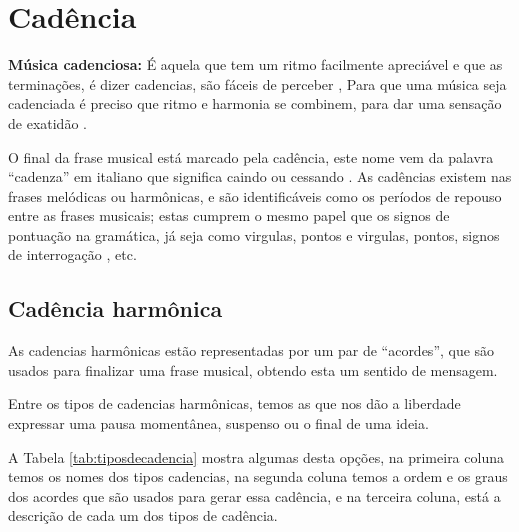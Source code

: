 \section{Cadência}
\label{sec:Cadencia}

\begin{tcbinformation} 
\textbf{Música cadenciosa:}
\label{ref:musicacadenciosa}
É aquela que tem um ritmo facilmente apreciável e que as terminações, é dizer cadencias,
são fáceis de perceber \cite[pp. 60]{pedrell2009diccionario},
Para que uma música seja cadenciada é preciso que ritmo e harmonia se combinem, 
para dar uma sensação de exatidão \cite[pp. 68]{melcior1859diccionario}.
\end{tcbinformation} 


O final da frase musical está marcado pela cadência, 
este nome vem da palavra ``cadenza''  em italiano que significa caindo ou cessando \cite[pp. 34]{bennett1993elementos} \cite[pp. 68]{melcior1859diccionario}. 
As cadências existem nas frases melódicas ou harmônicas, 
e são identificáveis como os períodos de repouso entre as frases musicais;
estas cumprem o mesmo papel que os signos de pontuação na gramática, 
já seja como virgulas, pontos e virgulas, pontos, signos de interrogação
\cite[pp. 66,67]{melcior1859diccionario} \cite[pp. 34]{bennett1993elementos}, 
etc.


\subsection{Cadência harmônica}
\label{sec:CadenciaHarmonica}

As cadencias harmônicas estão representadas por um par de ``acordes'', 
que são usados para finalizar uma frase musical, obtendo esta um sentido de mensagem. 

Entre os tipos de cadencias harmônicas, 
temos as que nos dão a liberdade expressar uma pausa momentânea, suspenso ou o final de uma ideia.

A Tabela \ref{tab:tiposdecadencia} mostra algumas desta opções, 
na primeira coluna temos os nomes dos tipos cadencias,
na segunda coluna temos a ordem e os graus dos acordes que são usados para gerar essa cadência,
e na terceira coluna, está a descrição de cada um dos tipos de cadência.

